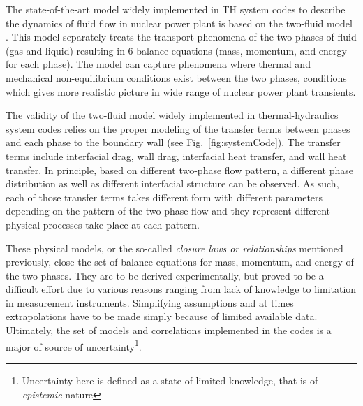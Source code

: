 \documentclass[11pt,titlepage]{article}
\begin{document}

The state-of-the-art model widely implemented in TH system codes to describe the dynamics of fluid flow in nuclear power plant is based on the two-fluid model \cite{Ishii2011}.
This model separately treats the transport phenomena of the two phases of fluid (gas and liquid) resulting in 6 balance equations (mass, momentum, and energy for each phase).
The model can capture phenomena where thermal and mechanical non-equilibrium conditions exist between the two phases, conditions which gives more realistic picture in wide range of nuclear power plant transients.

The validity of the two-fluid model widely implemented in thermal-hydraulics system codes relies on the proper modeling of the transfer terms between phases and each phase to the boundary wall (see Fig.~\ref{fig:systemCode}).
The transfer terms include interfacial drag, wall drag, interfacial heat transfer, and wall heat transfer.
In principle, based on different two-phase flow pattern, a different phase distribution as well as different interfacial structure can be observed.
As such, each of those transfer terms takes different form with different parameters depending on the pattern of the two-phase flow and they represent different physical processes take place at each pattern.
 
These physical models, or the so-called \emph{closure laws or relationships} mentioned previously, close the set of balance equations for mass, momentum, and energy of the two phases.
They are to be derived experimentally, but proved to be a difficult effort \cite{Nelson1992,Wulff2007} due to various reasons ranging from lack of knowledge to limitation in measurement instruments. 
Simplifying assumptions and at times extrapolations have to be made simply because of limited available data. 
Ultimately, the set of models and correlations implemented in the codes is a major of source of uncertainty\footnote{Uncertainty here is defined as a state of limited knowledge, that is of \emph{epistemic} nature}.
\end{document}
